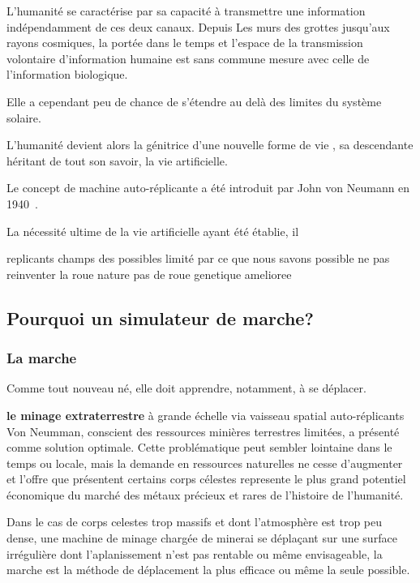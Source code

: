 \documentclass[journal, a4paper]{IEEEtran}
\begin{document}
	L'humanité se caractérise par sa capacité à transmettre une
	information indépendamment de ces deux canaux. Depuis Les murs
	des grottes jusqu'aux rayons cosmiques, la portée dans le temps et
	l'espace de la transmission volontaire d'information humaine est
	sans commune mesure avec
	celle de l'information biologique.

	Elle a cependant peu de chance de s'étendre au delà des limites du
	système solaire.

	L'humanité devient alors la génitrice d'une nouvelle forme de vie
	, sa
	descendante héritant de tout son savoir,
	la vie artificielle.

	Le concept de machine auto-réplicante a été introduit par John
	von Neumann en 1940~\cite{replicating-automata}.

	La nécessité ultime de la vie artificielle ayant été établie, il

	replicants
	champs des possibles limité par ce que nous savons possible
	ne pas reinventer la roue
	nature pas de roue
	genetique amelioree

	\subsection{Pourquoi un simulateur de marche?}
	\subsubsection{La marche}
	Comme tout nouveau né, elle doit apprendre, notamment, à se
	déplacer.

	\textbf{le minage extraterrestre} à grande échelle via vaisseau
	spatial auto-réplicants
	Von Neumman, conscient des ressources minières terrestres limitées,
	a présenté  comme solution optimale.
	Cette problématique peut sembler lointaine dans le temps ou locale,
	mais
	la demande en
	ressources naturelles ne cesse d'augmenter et l'offre que présentent
	certains corps célestes represente le plus grand potentiel économique
	du marché des métaux précieux et rares de l'histoire de l'humanité.

	Dans le cas de corps
	celestes trop massifs et dont l'atmosphère est trop peu dense,
	une machine
	de minage chargée de
	minerai se déplaçant sur une surface irrégulière dont l'aplanissement
	n'est pas rentable ou même envisageable, la marche est
	la méthode	de déplacement la plus efficace ou même la seule
	possible.
\end{document}

